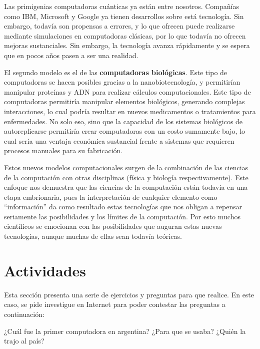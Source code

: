 Las primigenias computadoras cuánticas ya están entre nosotros. Compañías como
IBM, Microsoft y Google ya tienen desarrollos sobre está tecnología. Sin embargo,
todavía son propensas a errores, y lo que ofrecen puede realizarse mediante
simulaciones en computadoras clásicas, por lo que todavía no ofrecen mejoras
sustanciales. Sin embargo, la tecnología avanza rápidamente y se espera que en
pocos años pasen a ser una realidad.\autocite{mit_tech_2018_02}

El segundo modelo es el de las \textbf{computadoras biológicas}. Este tipo de
computadoras se hacen posibles gracias a la nanobiotecnología, y permitirían
manipular proteínas y ADN para realizar cálculos computacionales. Este tipo de
computadoras permitiría manipular elementos biológicos, generando complejas
interacciones, lo cual podría resultar en nuevos medicamentos o tratamientos
para enfermedades.\autocite{freitas_1999} No solo eso, sino que la capacidad de
los sistemas biológicos de autoreplicarse permitiría crear computadoras con un
costo sumamente bajo, lo cual sería una ventaja económica sustancial frente a
sistemas que requieren procesos manuales para su fabricación.

Estos nuevos modelos computacionales surgen de la combinación de las ciencias de
la computación con otras disciplinas (física y biología respectivamente). Este
enfoque nos demuestra que las ciencias de la computación están todavía en una
etapa embrionaria, pues la interpretación de cualquier elemento como ``información''
da como resultado estas tecnologías que nos obligan a repensar seriamente
las posibilidades y los límites de la computación. Por esto muchos científicos 
se emocionan con las posibilidades que auguran estas nuevas tecnologías, aunque
muchas de ellas sean todavía teóricas.

\section{Actividades}

Esta sección presenta una serie de ejercicios y preguntas para que realice.
En este caso, se pide investigue en Internet para poder contestar las 
preguntas a continuación:

\begin{exercise}
¿Cuál fue la primer computadora en argentina?
¿Para que se usaba? ¿Quién la trajo al país?
\end{exercise}

